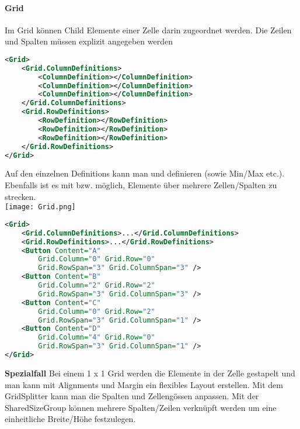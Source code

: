 \paragraph{Grid} Im Grid können Child Elemente einer Zelle darin zugeordnet werden. Die Zeilen und Spalten müssen explizit angegeben werden
\begin{lstlisting}[language=xml, caption="3 x 3 Grid"]
<Grid>
    <Grid.ColumnDefinitions>
        <ColumnDefinition></ColumnDefinition>
        <ColumnDefinition></ColumnDefinition>
        <ColumnDefinition></ColumnDefinition>
    </Grid.ColumnDefinitions>
    <Grid.RowDefinitions>
        <RowDefinition></RowDefinition>
        <RowDefinition></RowDefinition>
        <RowDefinition></RowDefinition>
    </Grid.RowDefinitions>
</Grid>
\end{lstlisting}
Auf den einzelnen Definitions kann man  und  definieren (sowie Min/Max etc.). Ebenfalls ist es mit  bzw.  möglich, Elemente über mehrere Zellen/Spalten zu strecken. \\
\texttt{[image: Grid.png]}
\begin{lstlisting}[language=xml]
<Grid>
    <Grid.ColumnDefinitions>...</Grid.ColumnDefinitions>
    <Grid.RowDefinitions>...</Grid.RowDefinitions>
    <Button Content="A"
        Grid.Column="0" Grid.Row="0"
        Grid.RowSpan="3" Grid.ColumnSpan="3" />
    <Button Content="B"
        Grid.Column="2" Grid.Row="2"
        Grid.RowSpan="3" Grid.ColumnSpan="3" />
    <Button Content="C"
        Grid.Column="0" Grid.Row="2"
        Grid.RowSpan="3" Grid.ColumnSpan="1" />
    <Button Content="D"
        Grid.Column="4" Grid.Row="0"
        Grid.RowSpan="3" Grid.ColumnSpan="1" />
</Grid>
\end{lstlisting}
\textbf{Spezialfall} Bei einem 1 x 1 Grid werden die Elemente in der Zelle gestapelt und man kann mit Alignments und Margin ein flexibles Layout erstellen. Mit dem GridSplitter kann man die Spalten und Zellengössen anpassen. Mit der SharedSizeGroup können mehrere Spalten/Zeilen verknüpft werden um eine einheitliche Breite/Höhe festzulegen.
